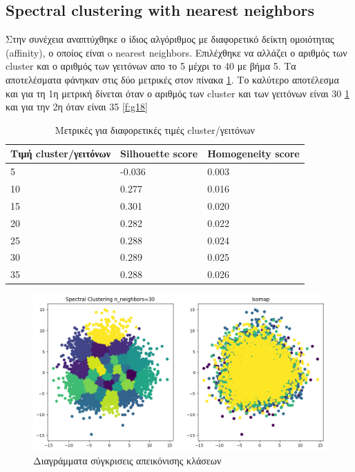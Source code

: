 		
		\subsection{Spectral clustering with nearest neighbors}
		
		Στην συνέχεια αναπτύχθηκε ο ίδιος αλγόριθμος με διαφορετικό δείκτη ομοιότητας (affinity), ο οποίος είναι o nearest neighbors. Επιλέχθηκε να αλλάζει ο αριθμός των cluster και ο αριθμός των γειτόνων απο το 5 μέχρι το 40 με βήμα 5. Τα αποτελέσματα φάνηκαν στις δύο μετρικές στον πίνακα \ref{tab:abc5}. Το καλύτερο αποτέλεσμα και για τη 1η μετρική δίνεται όταν ο αριθμός των cluster και των γειτόνων είναι 30 \ref{f:g17} και για την 2η όταν είναι 35 \ref{f:g18}
		
		\begin{table}[ht]
			\centering
			\caption{Μετρικές για διαφορετικές τιμές cluster/γειτόνων}
			\begin{tabular}{l | l | l}
				Τιμή cluster/γειτόνων & Silhouette score &  Homogeneity score\\
				\hline
				5 & -0.036 & 0.003\\
				10 & 0.277 & 0.016\\
				15 & 0.301&0.020\\
				20 & 0.282 & 0.022\\
				25 &0.288 & 0.024\\
				30 & 0.289 & 0.025\\
				35 & 0.288 & 0.026\\
			\end{tabular}
			
			\label{tab:abc5}
		\end{table}
		\begin{figure}[ht]
			\centering
			\includegraphics[width=1\linewidth]{Imagedata1/n_30isomap1.png}
			\caption{ Διαγράμματα σύγκρισεις απεικόνισης κλάσεων }
			\label{f:g17}	
		\end{figure}
